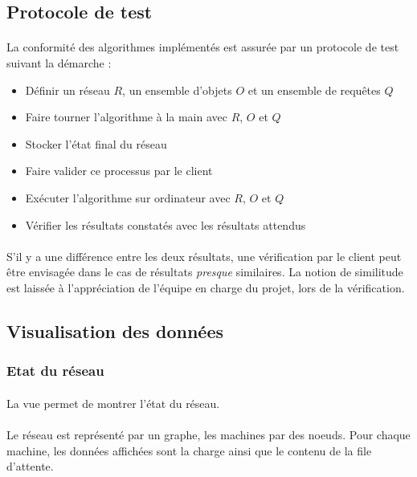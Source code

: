 \documentclass[12pt]{article}
\begin{document}
\subsection{Protocole de test}

\paragraph{} La conformité des algorithmes implémentés est assurée par un protocole de test suivant la démarche :

\begin{itemize}
	\item Définir un réseau $R$, un ensemble d'objets $O$ et un ensemble de requêtes $Q$
	\item Faire tourner l'algorithme à la main avec $R$, $O$ et $Q$
	\item Stocker l'état final du réseau
	\item Faire valider ce processus par le client
	\item Exécuter l'algorithme sur ordinateur avec $R$, $O$ et $Q$
	\item Vérifier les résultats constatés avec les résultats attendus
\end{itemize}
	
\paragraph{} S'il y a une différence entre les deux résultats, une vérification par le client peut être envisagée dans le cas de résultats \textit{presque} similaires. 
La notion de similitude est laissée à l'appréciation de l'équipe en charge du projet, lors de la vérification.

\subsection{Visualisation des données}

\subsubsection{Etat du réseau}

\paragraph{} La vue permet de montrer l'état du réseau.

\paragraph{} Le réseau est représenté par un graphe, les machines par des noeuds. 
Pour chaque machine, les données affichées sont la charge ainsi que le contenu de la file d'attente.
\end{document}
